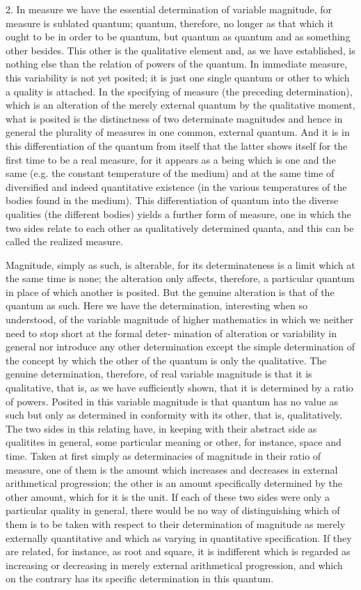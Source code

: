 2. In measure we have the essential determination of variable magnitude,
for measure is sublated quantum;
quantum, therefore, no longer as that
which it ought to be in order to be quantum,
but quantum as quantum and as something other besides.
This other is the qualitative element
and, as we have established, is nothing else
than the relation of powers of the quantum.
In immediate measure, this variability is not yet posited;
it is just one single quantum or other to which a quality is attached.
In the specifying of measure (the preceding determination),
which is an alteration of the merely external quantum
by the qualitative moment,
what is posited is the distinctness of two determinate magnitudes
and hence in general the plurality of measures
in one common, external quantum.
And it is in this differentiation of the quantum from itself
that the latter shows itself for the first time to be a real measure,
for it appears as a being which is one and the same
(e.g. the constant temperature of the medium)
and at the same time of diversified and indeed quantitative existence
(in the various temperatures of the bodies found in the medium).
This differentiation of quantum into the diverse qualities
(the different bodies) yields a further form of measure,
one in which the two sides relate to each other
as qualitatively determined quanta,
and this can be called the realized measure.

Magnitude, simply as such, is alterable, for its determinateness is
a limit which at the same time is none;
the alteration only affects, therefore,
a particular quantum in place of which another is posited.
But the genuine alteration is that of the quantum as such.
Here we have the determination, interesting when so understood,
of the variable magnitude of higher mathematics
in which we neither need to stop short at the formal deter-
mination of alteration or variability in general
nor introduce any other determination except
the simple determination of the concept by which
the other of the quantum is only the qualitative.
The genuine determination, therefore, of real variable magnitude is
that it is qualitative, that is, as we have sufficiently shown,
that it is determined by a ratio of powers.
Posited in this variable magnitude is
that quantum has no value as such but only
as determined in conformity with its other, that is, qualitatively.
The two sides in this relating have,
in keeping with their abstract side as qualitites in general,
some particular meaning or other, for instance, space and time.
Taken at first simply as determinacies of magnitude
in their ratio of measure,
one of them is the amount which increases and decreases
in external arithmetical progression;
the other is an amount specifically determined by the other amount,
which for it is the unit.
If each of these two sides were only a particular quality in general,
there would be no way of distinguishing which of them is
to be taken with respect to their determination of magnitude
as merely externally quantitative
and which as varying in quantitative specification.
If they are related, for instance, as root and square,
it is indifferent which is regarded as increasing or decreasing
in merely external arithmetical progression,
and which on the contrary has
its specific determination in this quantum.

